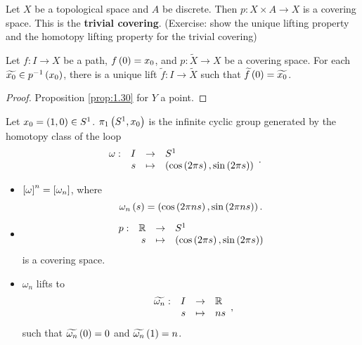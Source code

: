\begin{example*}
Let $ X $ be a topological space and $ A $ be discrete. Then $ p : X \times A \to X $ is a covering space. This is the \textbf{trivial covering}. (Exercise: show the unique lifting property and the homotopy lifting property for the trivial covering)
\end{example*}

\begin{corollary}
Let $ f : I \to X $ be a path, $ f\rb{0} = x_0 $, and $ p : \widetilde{X} \to X $ be a covering space. For each $ \widetilde{x_0} \in p^{-1}\rb{x_0} $, there is a unique lift $ \widetilde{f} : I \to \widetilde{X} $ such that $ \widetilde{f}\rb{0} = \widetilde{x_0} $.
\end{corollary}

\begin{proof}
Proposition \ref{prop:1.30} for $ Y $ a point.
\end{proof}

\begin{theorem}
\label{thm:1.7}
Let $ x_0 = \rb{1, 0} \in S^1 $. $ \pi_1\rb{S^1, x_0} $ is the infinite cyclic group generated by the homotopy class of the loop
$$ \function[\omega]{I}{S^1}{s}{\rb{\cos\rb{2\pi s}, \sin\rb{2\pi s}}}. $$
\end{theorem}

\begin{remark*}
\hfill
\begin{itemize}
\item $ \sb{\omega}^n = \sb{\omega_n} $, where
$$ \omega_n\rb{s} = \rb{\cos\rb{2\pi ns}, \sin\rb{2\pi ns}}. $$
\item
$$ \function[p]{\R}{S^1}{s}{\rb{\cos\rb{2\pi s}, \sin\rb{2\pi s}}} $$
is a covering space.
\item $ \omega_n $ lifts to
$$ \function[\widetilde{\omega_n}]{I}{\R}{s}{ns}, $$
such that $ \widetilde{\omega_n}\rb{0} = 0 $ and $ \widetilde{\omega_n}\rb{1} = n $.
\end{itemize}
\end{remark*}

